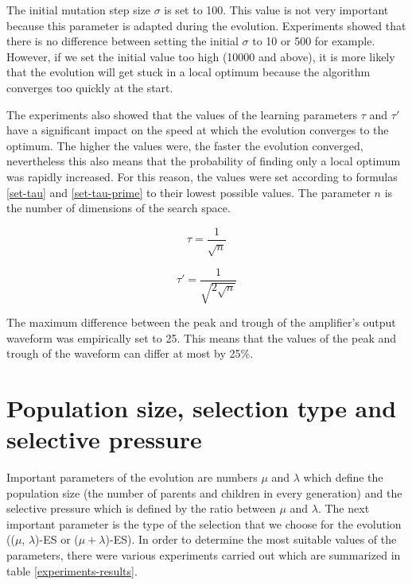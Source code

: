 The initial mutation step size $\sigma$ is set to 100. This value is not very important because this parameter is adapted during the evolution. Experiments showed that there is no difference between setting the initial $\sigma$ to 10 or 500 for example. However, if we set the initial value too high (10000 and above), it is more likely that the evolution will get stuck in a local optimum because the algorithm converges too quickly at the start.

The experiments also showed that the values of the learning parameters $\tau$ and $\tau'$ have a significant impact on the speed at which the evolution converges to the optimum. The higher the values were, the faster the evolution converged, nevertheless this also means that the probability of finding only a local optimum was rapidly increased. For this reason, the values were set according to formulas \ref{set-tau} and \ref{set-tau-prime} to their lowest possible values. The parameter $n$ is the number of dimensions of the search space.

\begin{equation} \label{set-tau}
    \tau = \frac{1}{\sqrt{n}}
\end{equation}

\begin{equation} \label{set-tau-prime}
    \tau' = \frac{1}{\sqrt{2\sqrt{n}}}
\end{equation}

The maximum difference between the peak and trough of the amplifier's output waveform was empirically set to 25. This means that the values of the peak and trough of the waveform can differ at most by 25\%.

\section{Population size, selection type and selective pressure}
\label{population-size}
Important parameters of the evolution are numbers $\mu$ and $\lambda$ which define the population size (the number of parents and children in every generation) and the selective pressure which is defined by the ratio between $\mu$ and $\lambda$. The next important parameter is the type of the selection that we choose for the evolution (($\mu$, $\lambda$)-ES or ($\mu + \lambda$)-ES). In order to determine the most suitable values of the parameters, there were various experiments carried out which are summarized in table \ref{experiments-results}.

